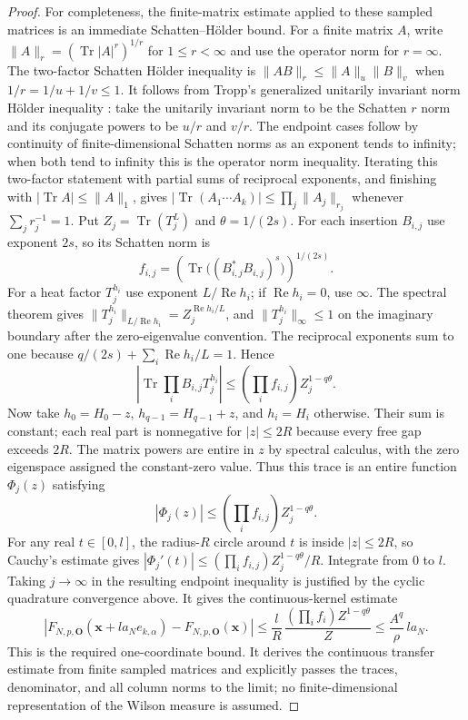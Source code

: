 \begin{proof}
For completeness, the finite-matrix estimate applied to these sampled matrices is an immediate Schatten--Hölder bound. For a finite matrix $A$, write $\|A\|_r=(\operatorname{Tr}|A|^r)^{1/r}$ for $1\leq r<\infty$ and use the operator norm for $r=\infty$. The two-factor Schatten Hölder inequality is $\|AB\|_r\leq\|A\|_u\|B\|_v$ when $1/r=1/u+1/v\leq1$. It follows from Tropp's generalized unitarily invariant norm Hölder inequality \cite[Theorem~6.32, p.~52]{Tropp}: take the unitarily invariant norm to be the Schatten $r$ norm and its conjugate powers to be $u/r$ and $v/r$. The endpoint cases follow by continuity of finite-dimensional Schatten norms as an exponent tends to infinity; when both tend to infinity this is the operator norm inequality. Iterating this two-factor statement with partial sums of reciprocal exponents, and finishing with $|\operatorname{Tr}A|\leq\|A\|_1$, gives $|\operatorname{Tr}(A_1\cdots A_k)|\leq\prod_j\|A_j\|_{r_j}$ whenever $\sum_jr_j^{-1}=1$. Put $Z_j=\operatorname{Tr}(T_j^L)$ and $\theta=1/(2s)$. For each insertion $B_{i,j}$ use exponent $2s$, so its Schatten norm is
\[
 f_{i,j}=\left(\operatorname{Tr}\big((B_{i,j}^*B_{i,j})^s\big)\right)^{1/(2s)}.
\]
For a heat factor $T_j^{h_i}$ use exponent $L/\operatorname{Re}h_i$; if $\operatorname{Re}h_i=0$, use $\infty$. The spectral theorem gives $\|T_j^{h_i}\|_{L/\operatorname{Re}h_i}=Z_j^{\operatorname{Re}h_i/L}$, and $\|T_j^{h_i}\|_\infty\leq1$ on the imaginary boundary after the zero-eigenvalue convention. The reciprocal exponents sum to one because $q/(2s)+\sum_i\operatorname{Re}h_i/L=1$. Hence
\[
 \left|\operatorname{Tr}\prod_i B_{i,j}T_j^{h_i}\right|
 \leq \left(\prod_i f_{i,j}\right)Z_j^{1-q\theta}.
\]
Now take $h_0=H_0-z$, $h_{q-1}=H_{q-1}+z$, and $h_i=H_i$ otherwise. Their sum is constant; each real part is nonnegative for $|z|\leq2R$ because every free gap exceeds $2R$. The matrix powers are entire in $z$ by spectral calculus, with the zero eigenspace assigned the constant-zero value. Thus this trace is an entire function $\Phi_j(z)$ satisfying
\[
 |\Phi_j(z)|\leq \left(\prod_i f_{i,j}\right)Z_j^{1-q\theta}.
\]
For any real $t\in[0,l]$, the radius-$R$ circle around $t$ is inside $|z|\leq2R$, so Cauchy's estimate gives $|\Phi_j'(t)|\leq (\prod_i f_{i,j})Z_j^{1-q\theta}/R$. Integrate from $0$ to $l$. Taking $j\to\infty$ in the resulting endpoint inequality is justified by the cyclic quadrature convergence above. It gives the continuous-kernel estimate
\[
 |F_{N,p,\mathbf O}(\mathbf x+l a_N e_{k,\alpha})-F_{N,p,\mathbf O}(\mathbf x)|
 \leq \frac{l}{R}\,\frac{(\prod_i f_i)Z^{1-q\theta}}{Z}
 \leq \frac{A^q}{\rho}\,l a_N.
\]
This is the required one-coordinate bound. It derives the continuous transfer estimate from finite sampled matrices and explicitly passes the traces, denominator, and all column norms to the limit; no finite-dimensional representation of the Wilson measure is assumed.


\end{proof}
